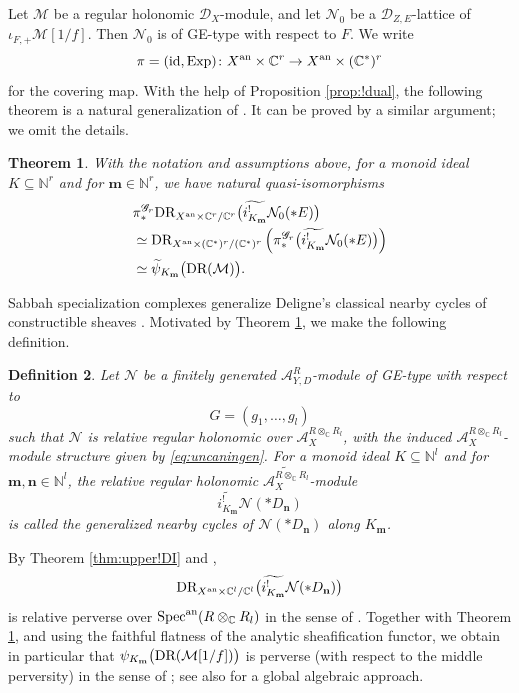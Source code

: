 \documentclass{amsart}
\theoremstyle{plain}
\newtheorem{theorem}{Theorem}
\numberwithin{theorem}{section}
\newtheorem{definition}[theorem]{Definition}
\theoremstyle{definition}
\theoremstyle{remark}
\theoremstyle{definition}
\newcommand{\wt}{\widetilde}
\newcommand{\C}{\mathbb{C}} %
\newcommand{\N}{\mathbb{N}}
\newcommand{\cM}{\mathcal{M}}
\newcommand{\cN}{\mathcal{N}}
\newcommand{\bn}{\mathbf{n}}
\newcommand{\bm}{\mathbf{m}}
\newcommand{\sA}{\mathscr{A}}
\newcommand{\sG}{\mathscr{G}}
\newcommand{\shD}{\mathscr{D}}
\newcommand{\Specan}{\textup{Spec}^{\textup{an}}}
\newcommand{\DR}{\textup{DR}}
\newcommand{\an}{\textup{an}}
\newcommand{\id}{\textup{id}}
\begin{document}
Let $\cM$ be a regular holonomic $\shD_X$-module, and let $\cN_0$ be a
$\shD_{Z,E}$-lattice of $\iota_{F,+}\cM[1/f]$. Then $\cN_0$ is of GE-type
with respect to $F$. We write
\[
\pi=(\id,\operatorname{Exp})
\colon
X^\an\times \C^r\to X^\an\times(\C^*)^r
\]
for the covering map. With the help of Proposition \ref{prop:!dual}, the
following theorem is a natural generalization of \cite[Thm.1.2]{WuRHA}. It
can be proved by a similar argument; we omit the details.

\begin{theorem}\label{thm:sabbspcmp}
With the notation and assumptions above, for a monoid ideal
$K\subseteq \N^r$ and for $\bm\in \N^r$, we have natural quasi-isomorphisms
\[
\begin{aligned}
&
\pi_*^{\sG_r}
\DR_{X^\an\times\C^r/\C^r}
\big(\wt{i^!_{K_\bm}}\cN_0(*E)\big)
\\
&\simeq
\DR_{X^\an\times(\C^*)^r/(\C^*)^r}
\left(
\pi_*^{\sG_r}
\big(\wt{i^!_{K_\bm}}\cN_0(*E)\big)
\right)
\\
&\simeq
\wt\psi_{K_\bm}\big(\DR(\cM)\big).
\end{aligned}
\]
\end{theorem}

Sabbah specialization complexes generalize Deligne's classical nearby cycles
of constructible sheaves \cite{Sab90}. Motivated by
Theorem \ref{thm:sabbspcmp}, we make the following definition.

\begin{definition}\label{def:grnearby}
Let $\cN$ be a finitely generated $\sA^R_{Y,D}$-module of GE-type with respect
to
\[
G=(g_1,\dots,g_l)
\]
such that $\cN$ is relative regular holonomic over
$\sA_X^{R\otimes_\C R_l}$, with the induced
$\sA_X^{R\otimes_\C R_l}$-module structure given by
\eqref{eq:uncaningen}. For a monoid ideal $K\subseteq \N^l$ and for
$\bm,\bn\in \N^l$, the relative regular holonomic
$\wt{\sA_X^{R\otimes_\C R_l}}$-module
\[
\wt{i^!_{K_\bm}}\cN(*D_\bn)
\]
is called the \emph{generalized nearby cycles} of $\cN(*D_\bn)$ along
$K_\bm$.
\end{definition}

By Theorem \ref{thm:upper!DI} and \cite[Thm. 4.1]{FTM18},
\[
\DR_{X^\an\times\C^l/\C^l}
\big(\wt{i^!_{K_\bm}}\cN(*D_\bn)\big)
\]
is relative perverse over $\Specan(R\otimes_\C R_l)$ in the sense of
\cite[Notation 3.3]{FTM18}. Together with Theorem \ref{thm:sabbspcmp}, and
using the faithful flatness of the analytic sheafification functor, we obtain
in particular that
$\psi_{K_\bm}\big(\DR(\cM[1/f])\big)$
is perverse (with respect to the middle perversity) in the sense of \cite[\S 10.3]{KSbook}; see also \cite[\S 3]{LMW}
for a global algebraic approach.
\end{document}
